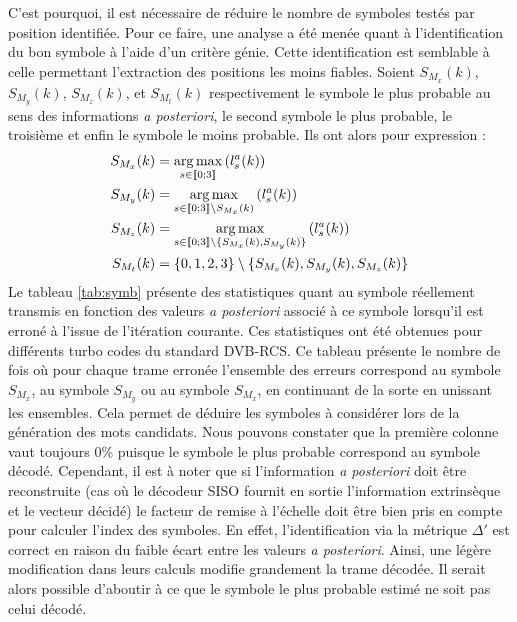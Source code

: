 C'est pourquoi, il est nécessaire de réduire le nombre de symboles testés par position identifiée. Pour ce faire, une 
analyse a été menée quant à l'identification du bon symbole à l'aide d'un critère génie. Cette identification est semblable 
à celle permettant l'extraction des positions les moins fiables.
Soient $S_{M_x}(k)$, $S_{M_y}(k)$, $S_{M_z}(k)$, et $S_{M_t}(k)$ respectivement le symbole le plus probable au sens 
des informations \textit{a posteriori}, le second symbole le plus probable, le troisième et enfin le symbole le moins 
probable. Ils ont alors pour expression :
\begin{align*}
S_{M_x}(k) &= \operatorname*{arg\,max}\limits_{s\in\llbracket0;3\rrbracket}\left(l^a_s(k)\right) \\
S_{M_y}(k) &= \operatorname*{arg\,max}\limits_{s\in\llbracket0;3\rrbracket\setminus{S_{M_x}(k)}}\left(l^a_s(k)\right)\\
S_{M_z}(k) &= \operatorname*{arg\,max}\limits_{s\in\llbracket0;3\rrbracket\setminus{\{S_{M_x}(k)}, S_{M_y}(k)\}}\left(l^a_s(k)\right)\\
S_{M_t}(k) &= \{0,1,2,3\}\setminus{\{S_{M_x}(k), S_{M_y}(k), S_{M_z}(k)\}}
\end{align*}
Le tableau \ref{tab:symb} présente des statistiques quant au symbole réellement transmis en fonction des valeurs 
\textit{a posteriori} associé à ce symbole lorsqu'il est erroné à l'issue de l'itération courante. Ces statistiques ont été obtenues pour différents turbo
codes du standard DVB-RCS. Ce tableau présente le nombre de fois où pour chaque trame erronée l'ensemble des erreurs 
correspond au symbole $S_{M_x}$, au symbole $S_{M_y}$ ou au symbole $S_{M_x}$, en continuant de la sorte en 
unissant les ensembles. Cela permet de déduire les symboles à considérer lors de la génération des 
mots candidats. Nous pouvons constater que la première colonne vaut toujours 0\% puisque le symbole le plus probable correspond au
symbole décodé. Cependant, il est à noter que si l'information \textit{a posteriori} doit être reconstruite (cas où le 
décodeur SISO fournit en sortie l'information extrinsèque et le vecteur décidé) le facteur de remise à l'échelle doit 
être bien pris en compte pour calculer l'index des symboles. En effet, l'identification via la métrique $\Delta'$ est correct
en raison du faible écart entre les valeurs \textit{a posteriori}. Ainsi, une légère modification dans leurs calculs 
modifie grandement la trame décodée. Il serait alors possible d'aboutir à ce que le symbole le plus probable estimé ne
soit pas celui décodé.
